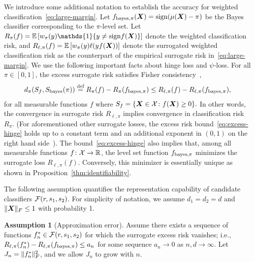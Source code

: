 \documentclass[11pt]{article}
\theoremstyle{plain}
\theoremstyle{definition}
\newtheorem{assumption}{Assumption}
\def\sign{\textup{sign}}
\def\bayesS{S_{\textup{bayes}}}
\def\bayespif{f_{\textup{bayes},\pi}}
\begin{document}
We introduce some additional notation to establish the accuracy for weighted classification~\eqref{eq:large-margin}. Let $f_{\text{bayes},\pi}(\mX)=\sign(\mu(\mX) -\pi)$ be the Bayes classifier corresponding to the $\pi$-level set. Let $R_{\pi}( f)=\mathbb{E}\left[w_\pi(y)\mathds{1}\{y\neq \sign f(\mX)\}\right]$ denote the weighted classification risk, and $R_{\ell,\pi}(f)=\mathbb{E}\left[w_\pi(y)\ell(yf(\bm X))\right]$ denote the surrogated weighted classification risk as the counterpart of the empirical surrogate risk in~\eqref{eq:large-margin}. We use the following important facts about hinge loss and $\psi$-loss. For all $\pi\in[0,1]$, the excess surrogate risk satisfies Fisher consistency~\citep{bartlett2006convexity},
\begin{equation}\label{eq:excess-hinge}
d_\pi(S_f,\bayesS(\pi)) \stackrel{\text{def}}{=} R_{\pi}(f)-R_{\pi}(\bayespif) \leq R_{\ell,\pi}(f)-R_{\ell,\pi}(\bayespif), 
\end{equation}
for all measurable functions $f$ where $S_f  = \{\bm X\in \mathcal{X} \colon f(\bm X)\geq 0\}.$ In other words, the convergence in surrogate risk $R_{\ell,\pi}$ implies convergence in classification risk $R_{\pi}$. (For aforementioned other surrogate losses, the excess risk bound~\eqref{eq:excess-hinge} holds up to a constant term and an additional exponent in $(0,1)$ on the right hand side~\citep{scott2011surrogate}). The bound~\eqref{eq:excess-hinge} also implies that, among all measurable functions $f\colon \mathcal{X} \to\mathbb{R}$, the level set function $\bayespif$ minimizes the surrogate loss $R_{\ell,\pi}(f)$. Conversely, this minimizer is essentially unique as shown in Proposition~\ref{thm:identifiability}. 

The following assumption quantifies the representation capability of candidate classifiers $\mathcal{F}(r,s_1,s_2)$. For simplicity of notation, we assume $d_1=d_2=d$ and $\lVert\bm X\rVert_F\leq 1$ with probability 1. 
\begin{assumption}[Approximation error]\label{ass:main} 
Assume there exists a sequence of functions $f_n^*\in\mathcal{F}(r,s_1,s_2)$ for which the surrogate excess risk vanishes; i.e., $R_{\ell,\pi}(f^*_n)-R_{\ell,\pi}(\bayespif)\leq a_n$ for some sequence $a_n\to 0$ as $n,d\to \infty$. Let $J_n=\lVert f^*_n\rVert_F^2$, and we allow $J_n$ to grow with $n$. 
\end{assumption}
\end{document}
